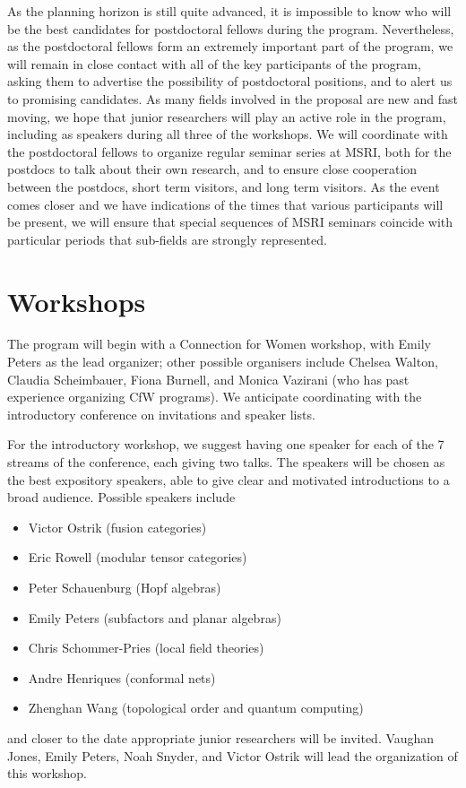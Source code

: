 \documentclass[12pt]{article}
\begin{document}
As the planning horizon is still quite advanced, it is impossible to know who will be the best candidates for postdoctoral fellows during the program. Nevertheless, as the postdoctoral fellows form an extremely important part of the program, we will remain in close contact with all of the key participants of the program, asking them to advertise the possibility of postdoctoral positions, and to alert us to promising candidates. As many fields involved in the proposal are new and fast moving, we hope that junior researchers will play an active role in the program, including as speakers during all three of the workshops. We will coordinate with the postdoctoral fellows to organize regular seminar series at MSRI, both for the postdocs to talk about their own research, and to ensure close cooperation between the postdocs, short term visitors, and long term visitors. As the event comes closer and we have indications of the times that various participants will be present, we will ensure that special sequences of MSRI seminars coincide with particular periods that sub-fields are strongly represented. 

\section{Workshops}
The program will begin with a Connection for Women workshop, with Emily Peters as the lead organizer; other possible organisers include Chelsea Walton, Claudia Scheimbauer, Fiona Burnell, and Monica Vazirani (who has past experience organizing CfW programs). We anticipate coordinating with the introductory conference on invitations and speaker lists. 

For the introductory workshop, we suggest having one speaker for each of the 7 streams of the conference, each giving two talks.
The speakers will be chosen as the best expository speakers, able to give clear and motivated introductions to a broad audience.  Possible speakers include
\begin{itemize}
  \setlength{\itemsep}{1pt}
  \setlength{\parskip}{0pt}
  \setlength{\parsep}{0pt}
\item Victor Ostrik (fusion categories) 
\item Eric Rowell (modular tensor categories)
\item Peter Schauenburg (Hopf algebras)
\item Emily Peters (subfactors and planar algebras) %
\item Chris Schommer-Pries (local field theories) %
\item Andre Henriques (conformal nets) %
\item Zhenghan Wang (topological order and quantum computing) %
\end{itemize}
and closer to the date appropriate junior researchers will be invited. Vaughan Jones, Emily Peters, Noah Snyder, and Victor Ostrik will lead the organization of this workshop.
\end{document}
